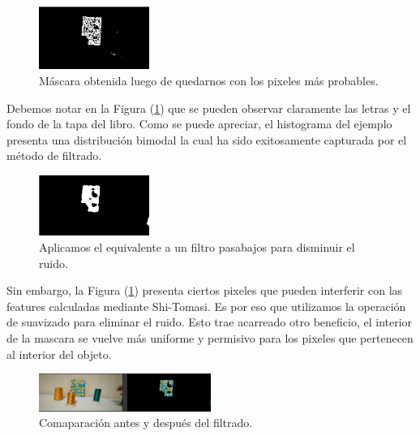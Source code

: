 \begin{figure}[H]
	\centering
	\includegraphics[width=0.32\textwidth]{Imagenes/mascara_bimodal.PNG}
	\caption{Máscara obtenida luego de quedarnos con los pixeles más probables.}
	\label{fig:noisy_lpf}
\end{figure}
Debemos notar en la Figura (\ref{fig:noisy_lpf}) que se pueden observar claramente las letras y el fondo de la tapa del libro. Como se puede apreciar, el histograma del ejemplo presenta una distribución bimodal la cual ha sido exitosamente capturada por el método de filtrado.

\begin{figure}[H]
	\centering
	\includegraphics[width=0.32\textwidth]{Imagenes/mascara_bimodal_lpf.PNG}
	\caption{Aplicamos el equivalente a un filtro pasabajos para disminuir el ruido.}
	\label{fig:lpf_hist}
\end{figure}

Sin embargo, la Figura (\ref{fig:noisy_lpf}) presenta ciertos pixeles que pueden interferir con las features calculadas mediante Shi-Tomasi. Es por eso que utilizamos la operación de suavizado para eliminar el ruido. Esto trae acarreado otro beneficio, el interior de la mascara se vuelve más uniforme y permisivo para los pixeles que pertenecen al interior del objeto.
\begin{figure}[H]
	\centering
	\includegraphics[width=0.5\textwidth]{Imagenes/camshift_mask3.png}
	\caption{Comaparación antes y después del filtrado.}
\end{figure}
 

